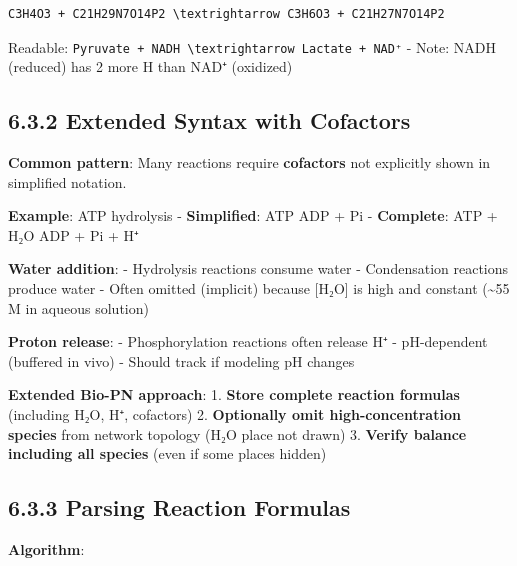 \begin{lstlisting}
C3H4O3 + C21H29N7O14P2 \textrightarrow C3H6O3 + C21H27N7O14P2
\end{lstlisting}

Readable: \passthrough{\lstinline!Pyruvate + NADH \textrightarrow Lactate + NAD⁺!} -
Note: NADH (reduced) has 2 more H than NAD⁺ (oxidized)

\hypertarget{extended-syntax-with-cofactors}{%
\subsection{6.3.2 Extended Syntax with
Cofactors}\label{extended-syntax-with-cofactors}}

\textbf{Common pattern}: Many reactions require \textbf{cofactors} not
explicitly shown in simplified notation.

\textbf{Example}: ATP hydrolysis - \textbf{Simplified}: ATP \textrightarrow ADP + Pi -
\textbf{Complete}: ATP + H₂O \textrightarrow ADP + Pi + H⁺

\textbf{Water addition}: - Hydrolysis reactions consume water -
Condensation reactions produce water - Often omitted (implicit) because
{[}H₂O{]} is high and constant (\textasciitilde55 M in aqueous solution)

\textbf{Proton release}: - Phosphorylation reactions often release H⁺ -
pH-dependent (buffered in vivo) - Should track if modeling pH changes

\textbf{Extended Bio-PN approach}: 1. \textbf{Store complete reaction
formulas} (including H₂O, H⁺, cofactors) 2. \textbf{Optionally omit
high-concentration species} from network topology (H₂O place not drawn)
3. \textbf{Verify balance including all species} (even if some places
hidden)

\hypertarget{parsing-reaction-formulas}{%
\subsection{6.3.3 Parsing Reaction
Formulas}\label{parsing-reaction-formulas}}

\textbf{Algorithm}:

